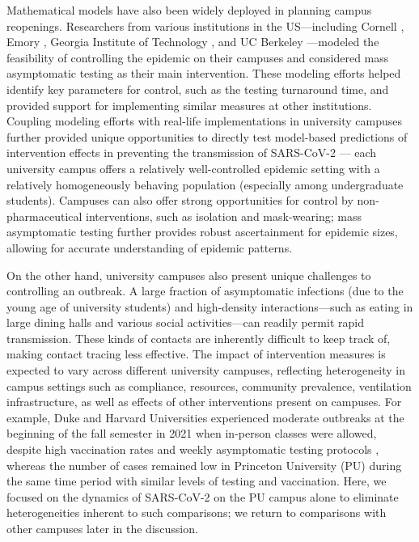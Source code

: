 \documentclass[12pt]{article}
\begin{document}
Mathematical models have also been widely deployed in planning campus reopenings.
Researchers from various institutions in the US---including Cornell \citep{frazier2022modeling}, Emory \citep{lopman2020model}, Georgia Institute of Technology \citep{gibson2021surveillance}, and UC Berkeley \citep{brook2021optimizing}---modeled the feasibility of controlling the epidemic on their campuses and considered mass asymptomatic testing as their main intervention.
These modeling efforts helped identify key parameters for control, such as the testing turnaround time, and provided support for implementing similar measures at other institutions.
Coupling modeling efforts with real-life implementations in university campuses further provided unique opportunities to directly test model-based predictions of intervention effects in preventing the transmission of SARS-CoV-2 \citep{frazier2022modeling}---
each university campus offers a relatively well-controlled epidemic setting with a relatively homogeneously behaving population (especially among undergraduate students).
Campuses can also offer strong opportunities for control by non-pharmaceutical interventions, such as isolation and mask-wearing;
mass asymptomatic testing further provides robust ascertainment for epidemic sizes, allowing for accurate understanding of epidemic patterns.

On the other hand, university campuses also present unique challenges to controlling an outbreak.
A large fraction of asymptomatic infections (due to the young age of university students) and high-density interactions---such as eating in large dining halls and various social activities---can readily permit rapid transmission.
These kinds of contacts are inherently difficult to keep track of, making contact tracing less effective.
The impact of intervention measures is expected to vary across different university campuses, reflecting heterogeneity in campus settings such as compliance, resources, community prevalence, ventilation infrastructure, as well as effects of other interventions present on campuses.
For example, Duke and Harvard Universities experienced moderate outbreaks at the beginning of the fall semester in 2021 when in-person classes were allowed, despite high vaccination rates and weekly asymptomatic testing protocols \citep{dukeoutbreak,harvardoutbreak}, whereas the number of cases remained low in Princeton University (PU) during the same time period with similar levels of testing and vaccination.
Here, we focused on the dynamics of SARS-CoV-2 on the PU campus alone to eliminate heterogeneities inherent to such comparisons; we return to comparisons with other campuses later in the discussion.
\end{document}
